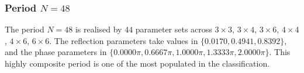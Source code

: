 \par
\subsubsection{Period $N = 48$}
The period $N=48$ is realised by $44$ parameter sets across $3\times3$, $3\times4$, $3\times6$, $4\times4$, $4\times6$, $6\times6$. The reflection parameters take values in $\{0.0170, 0.4941, 0.8392\}$, and the phase parameters in $\{0.0000\pi, 0.6667\pi, 1.0000\pi, 1.3333\pi, 2.0000\pi\}$. This highly composite period is one of the most populated
in the classification.
